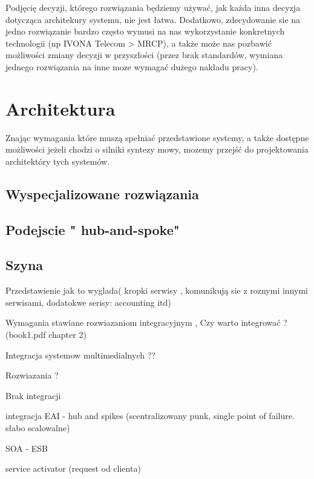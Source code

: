 Podjęcię decyzji, którego rozwiązania będziemy używać, jak każda inna decyzja dotycząca architekury systemu, nie jest łatwa. Dodatkowo, zdecydowanie sie na jedno rozwiązanie bardzo często wymusi na nas wykorzystanie konkretnych technologii (np IVONA Telecom > MRCP), a także może nas pozbawić możliwości zmiany decyzji w przyszłości (przez brak standardów, wymiana jednego rozwiązania na inne moze wymagać dużego nakładu pracy).

\section {Architektura}

Znając wymagania które muszą spełniać przedstawione systemy, a także dostępne możliwości jeżeli chodzi o silniki syntezy mowy,  mozemy przejść do projektowania architektóry tych systemów.

\subsection {Wyspecjalizowane rozwiązania}
\subsection {Podejscie " hub-and-spoke"}
\subsection {Szyna} 

Przedstawienie jak to wyglada( kropki serwisy , komunikują sie z roznymi innymi serwisami, dodatokwe serisy: accounting itd)

Wymagania stawiane rozwiazaniom integracyjnym , Czy warto integrować ? (book1.pdf chapter 2)

Integracja systemow multimedialnych ??

Rozwiazania ?

Brak integracji

integracja EAI - hub and spikes (scentralizowany punk, single point of failure. słabo scalowalne)

SOA - ESB 




service activator (request od clienta)



